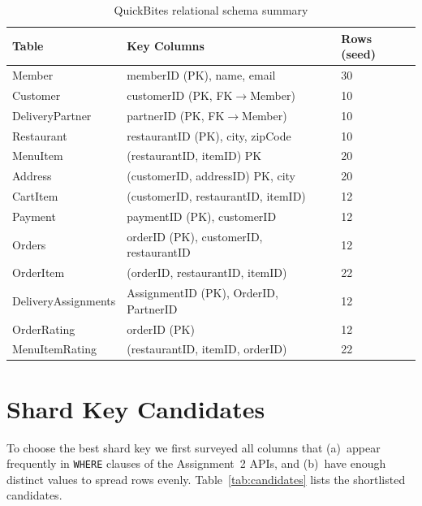 \documentclass[12pt, a4paper]{article}
\renewcommand{\_}{\plainunderscore\allowbreak}
\begin{document}
\begin{table}[h!]
\centering
\caption{QuickBites relational schema summary}
\label{tab:schema}
\begin{tabular}{@{} L{3.6cm} L{6.0cm} R{2.0cm} @{}}
\toprule
\textbf{Table} & \textbf{Key Columns} & \textbf{Rows (seed)} \\
\midrule
Member              & memberID (PK), name, email           & 30 \\
Customer            & customerID (PK, FK$\to$Member)       & 10 \\
DeliveryPartner     & partnerID (PK, FK$\to$Member)        & 10 \\
Restaurant          & restaurantID (PK), city, zipCode     & 10 \\
MenuItem            & (restaurantID, itemID) PK            & 20 \\
Address             & (customerID, addressID) PK, city     & 20 \\
CartItem            & (customerID, restaurantID, itemID)   & 12 \\
Payment             & paymentID (PK), customerID           & 12 \\
Orders              & orderID (PK), customerID, restaurantID & 12 \\
OrderItem           & (orderID, restaurantID, itemID)      & 22 \\
Delivery\_Assignments & AssignmentID (PK), OrderID, PartnerID & 12 \\
OrderRating         & orderID (PK)                         & 12 \\
MenuItemRating      & (restaurantID, itemID, orderID)      & 22 \\
\bottomrule
\end{tabular}
\end{table}

\section{Shard Key Candidates}

To choose the best shard key we first surveyed all columns that
(a)~appear frequently in \texttt{WHERE} clauses of the Assignment~2 APIs, and
(b)~have enough distinct values to spread rows evenly.
Table~\ref{tab:candidates} lists the shortlisted candidates.
\end{document}
